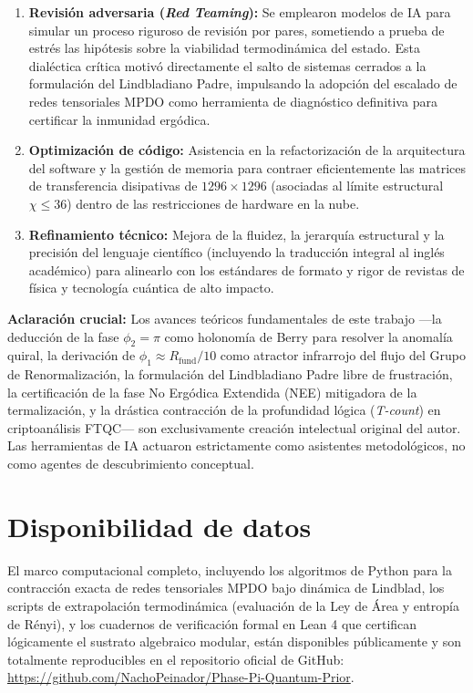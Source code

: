 \documentclass[12pt,a4paper]{article}
\theoremstyle{plain}
\theoremstyle{definition}
\theoremstyle{remark}
\begin{document}
\begin{enumerate}
    \item \textbf{Revisión adversaria (\textit{Red Teaming}):} Se emplearon modelos de IA para simular un proceso riguroso de revisión por pares, sometiendo a prueba de estrés las hipótesis sobre la viabilidad termodinámica del estado. Esta dialéctica crítica motivó directamente el salto de sistemas cerrados a la formulación del Lindbladiano Padre, impulsando la adopción del escalado de redes tensoriales MPDO como herramienta de diagnóstico definitiva para certificar la inmunidad ergódica.
    \item \textbf{Optimización de código:} Asistencia en la refactorización de la arquitectura del software y la gestión de memoria para contraer eficientemente las matrices de transferencia disipativas de $1296 \times 1296$ (asociadas al límite estructural $\chi \le 36$) dentro de las restricciones de hardware en la nube.
    \item \textbf{Refinamiento técnico:} Mejora de la fluidez, la jerarquía estructural y la precisión del lenguaje científico (incluyendo la traducción integral al inglés académico) para alinearlo con los estándares de formato y rigor de revistas de física y tecnología cuántica de alto impacto.
\end{enumerate}

\textbf{Aclaración crucial:} Los avances teóricos fundamentales de este trabajo —la deducción de la fase $\phi_2 = \pi$ como holonomía de Berry para resolver la anomalía quiral, la derivación de $\phi_1 \approx R_{\text{fund}}/10$ como atractor infrarrojo del flujo del Grupo de Renormalización, la formulación del Lindbladiano Padre libre de frustración, la certificación de la fase No Ergódica Extendida (NEE) mitigadora de la termalización, y la drástica contracción de la profundidad lógica (\textit{T-count}) en criptoanálisis FTQC— son exclusivamente creación intelectual original del autor. Las herramientas de IA actuaron estrictamente como asistentes metodológicos, no como agentes de descubrimiento conceptual.

\section{Disponibilidad de datos}
El marco computacional completo, incluyendo los algoritmos de Python para la contracción exacta de redes tensoriales MPDO bajo dinámica de Lindblad, los scripts de extrapolación termodinámica (evaluación de la Ley de Área y entropía de Rényi), y los cuadernos de verificación formal en Lean 4 que certifican lógicamente el sustrato algebraico modular, están disponibles públicamente y son totalmente reproducibles en el repositorio oficial de GitHub: \url{https://github.com/NachoPeinador/Phase-Pi-Quantum-Prior}. 
\end{document}

